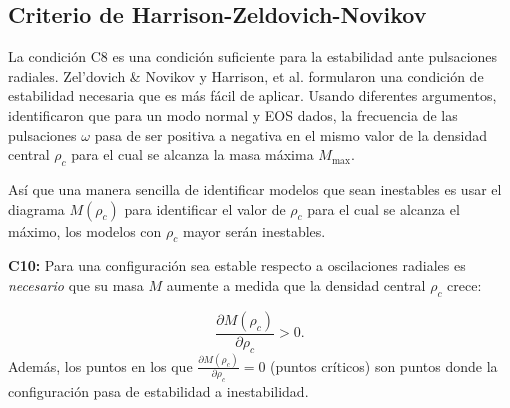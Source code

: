 \subsection*{Criterio de Harrison-Zeldovich-Novikov}

\noindent La condición C8 es una condición suficiente para la estabilidad ante pulsaciones radiales. Zel'dovich \& Novikov \cite{Zeldovich1971} y Harrison, et al. \cite{Harrison1965} formularon una condición de estabilidad necesaria que es más fácil de aplicar. Usando diferentes argumentos, identificaron que para un modo normal y EOS dados, la frecuencia de las pulsaciones $\omega$ pasa de ser positiva a negativa en el mismo valor de la densidad central $\rho_c$ para el cual se alcanza la masa máxima $M_{\text{max}}$. 

Así que una manera sencilla de identificar modelos que sean inestables es usar el diagrama $M(\rho_c)$ para identificar el valor de $\rho_c$ para el cual se alcanza el máximo, los modelos con $\rho_c$ mayor serán inestables. 

\textbf{C10:} Para una configuración sea estable respecto a oscilaciones radiales es \emph{necesario} que su masa $M$ aumente a medida que la densidad central $\rho_{c}$ crece: 

\begin{equation}
    \frac { \partial M \left( \rho _ { c } \right) } { \partial \rho _ { c } } > 0.
\end{equation}
Además, los puntos en los que $\frac { \partial M \left( \rho _ { c } \right) } { \partial \rho _ { c } } = 0$ (puntos críticos) son puntos donde la configuración pasa de estabilidad a inestabilidad.



